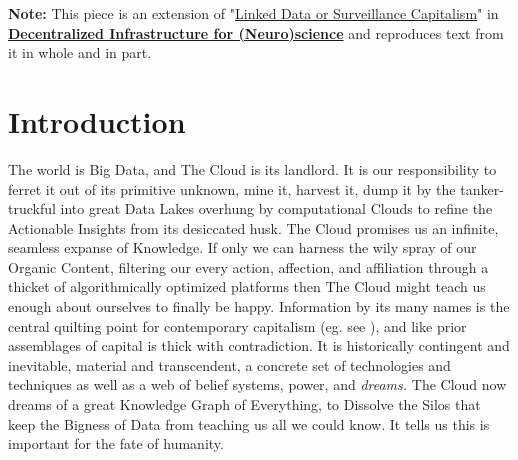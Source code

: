 \documentclass{article}
\begin{document}
\restoregeometry
\clearpage

\textbf{Note:} This piece is an extension of "\href{https://jon-e.net/infrastructure/#linked-data-or-surveillance-capitalism}{Linked Data or Surveillance Capitalism}" in \textbf{\href{https://jon-e.net/infrastructure}{Decentralized Infrastructure for (Neuro)science}} \cite{saundersDecentralizedInfrastructureNeuro2022} and reproduces text from it in whole and in part.


\hypertarget{introduction}{%
\section{Introduction}\label{introduction}}

The world is Big Data, and The Cloud is its landlord. It is our
responsibility to ferret it out of its primitive unknown, mine it,
harvest it, dump it by the tanker-truckful into great Data Lakes
overhung by computational Clouds to refine the Actionable Insights from
its desiccated husk. The Cloud promises us an infinite, seamless expanse
of Knowledge. If only we can harness the wily spray of our Organic
Content, filtering our every action, affection, and affiliation through
a thicket of algorithmically optimized platforms then The Cloud might
teach us enough about ourselves to finally be happy. Information by its
many names is the central quilting point for contemporary capitalism
(eg. see \cite{warkCapitalDeadThis2021} ), and like prior
assemblages of capital is thick with contradiction. It is historically
contingent and inevitable, material and transcendent, a concrete set of
technologies and techniques as well as a web of belief systems, power,
and \emph{dreams.} The Cloud now dreams of a great Knowledge Graph of
Everything, to Dissolve the Silos that keep the Bigness of Data from
teaching us all we could know. It tells us this is important for the
fate of humanity.
\end{document}
